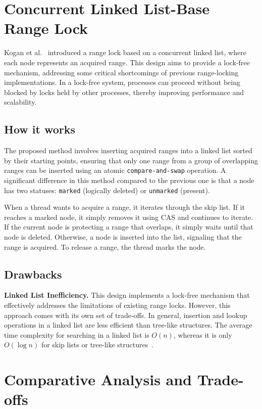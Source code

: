 \section{Concurrent Linked List-Base Range Lock}

Kogan et al.~\parencite{kogan2020scalable} introduced a range lock based on a concurrent linked list, where each node represents an acquired range. 
This design aims to provide a lock-free mechanism, addressing some critical shortcomings of previous range-locking implementations. 
In a lock-free system, processes can proceed without being blocked by locks held by other processes, thereby improving performance and scalability. 

\subsection*{How it works}

The proposed method involves inserting acquired ranges into a linked list sorted by their starting points, ensuring that only one range from a group of overlapping ranges can be inserted using an atomic \texttt{compare-and-swap} operation. 
A significant difference in this method compared to the previous one is that a node has two statuses: \texttt{marked} (logically deleted) or \texttt{unmarked} (present). 

When a thread wants to acquire a range, it iterates through the skip list. 
If it reaches a marked node, it simply removes it using CAS and continues to iterate. 
If the current node is protecting a range that overlaps, it simply waits until that node is deleted.
Otherwise, a node is inserted into the list, signaling that the range is acquired. 
To release a range, the thread marks the node. 
\subsection*{Drawbacks}

\textbf{Linked List Inefficiency.}
This design implements a lock-free mechanism that effectively addresses the limitations of existing range locks. 
However, this approach comes with its own set of trade-offs. 
In general, insertion and lookup operations in a linked list are less efficient than tree-like structures. 
The average time complexity for searching in a linked list is \( O(n) \), whereas it is only \( O(\log n) \) for skip lists or tree-like structures~\parencite{fomitchev2004lock}.


\section{Comparative Analysis and Trade-offs}

